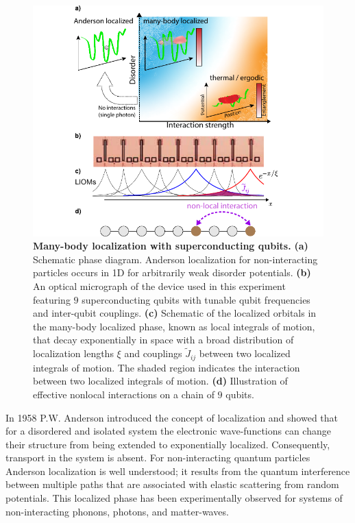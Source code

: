 \begin{figure}[t]
    \centering
    \hspace*{-25pt}
    \includegraphics[width=75 mm,keepaspectratio]{./PDF/f1_190716_1106a.pdf}
    \caption{\small
    \textbf{Many-body localization with superconducting qubits.}
    \textbf{(a)} Schematic phase diagram.
    Anderson localization for non-interacting particles occurs in 1D for arbitrarily weak disorder potentials.
    \textbf{(b)} An optical micrograph of the device used in this experiment featuring $9$ superconducting qubits with tunable qubit frequencies and inter-qubit couplings.
    \textbf{(c)} Schematic of the localized orbitals in the many-body localized phase, known as local integrals of motion, that decay exponentially in space with a broad distribution of localization lengths $\xi$ and couplings $\widetilde{J}_{ij}$ between two localized integrals of motion.
    The shaded region indicates the interaction between two localized integrals of motion.
    \textbf{(d)} Illustration of effective nonlocal interactions on a chain of $9$ qubits.
    }
    \label{fig_1}
\end{figure}

In 1958 P.W. Anderson introduced the concept of localization
and showed that for a disordered and isolated system the electronic wave-functions can change their structure from being extended to exponentially localized.
Consequently, transport in the system is absent. %
For non-interacting quantum particles Anderson localization is well understood;
it results from the quantum interference between multiple paths that are associated with elastic scattering from random potentials.
This localized phase has been experimentally observed for systems of non-interacting phonons, photons, and matter-waves.\autocite{Billy2008, Weaver1990, Wiersma1997, Schwartz2007} %

